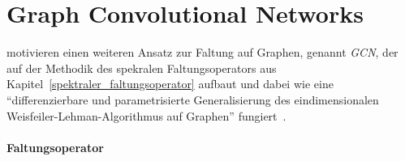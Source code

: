 \section{Graph Convolutional Networks}
\label{graph_convolutional_networks}

\citeauthor{gcn} motivieren einen weiteren Ansatz zur Faltung auf Graphen, genannt \emph{\gls{GCN}}, der auf der Methodik des spekralen Faltungsoperators aus Kapitel~\ref{spektraler_faltungsoperator} aufbaut und dabei wie eine \enquote{differenzierbare und parametrisierte Generalisierung des eindimensionalen Weisfeiler-Lehman-Algorithmus auf Graphen} fungiert~\cite{gcn}.

\paragraph{Faltungsoperator}
\label{gcn_faltungsoperator}

